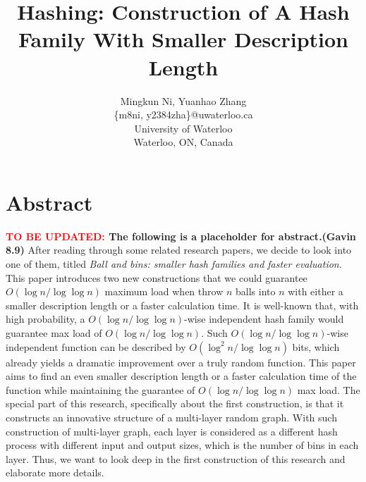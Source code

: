 \documentclass[letterpaper]{article} %
\begin{document}
\selectfont
\linespread{1.5}
	\title{Hashing: Construction of A Hash Family With Smaller Description Length}
	\author{Mingkun Ni, Yuanhao Zhang\\
		\{m8ni, y2384zha\}@uwaterloo.ca\\
		University of Waterloo\\
		Waterloo, ON, Canada\\
	}
	\maketitle
		
	\section{Abstract}
	\textbf{\textcolor{red}{TO BE UPDATED:} The following is a placeholder for abstract.(Gavin 8.9)}
		\quad After reading through some related research papers, we decide to look into one of them, titled \textit{Ball and bins: smaller hash families and faster evaluation}. This paper introduces two new constructions that we could guarantee $O(\log n/\log\log n)$ maximum load when throw $n$ balls into $n$ with either a smaller description length or a faster calculation time. It is well-known that, with high probability, a $O(\log n/\log\log n)$-wise independent hash family would guarantee max load of $O(\log n/\log\log n)$. Such $O(\log n/\log\log n)$-wise independent function can be described by $O(\log^2 n/\log\log n)$ bits, which already yields a dramatic improvement over a truly random function. This paper aims to find an even smaller description length or a faster calculation time of the function while maintaining the guarantee of $O(\log n/\log\log n)$ max load. The special part of this research, specifically about the first construction, is that it constructs an innovative structure of a multi-layer random graph. With such construction of multi-layer graph, each layer is considered as a different hash process with different input and output sizes, which is the number of bins in each layer. Thus, we want to look deep in the first construction of this research and elaborate more details.
	
	\newpage
\end{document}

